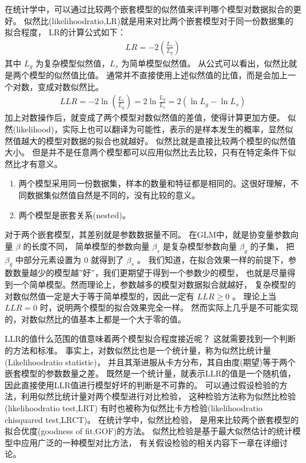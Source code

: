 \documentclass[letterpaper,10pt,english]{sphinxmanual}
\begin{document}
在统计学中，可以通过比较两个嵌套模型的似然值来评判哪个模型对数据拟合的更好。
似然比(likelihood\sphinxhyphen{}ratio,LR)就是用来对比两个嵌套模型对于同一份数据集的拟合程度，
LR的计算公式如下：
\begin{equation}\label{equation:模型评估/content:模型评估/content:5}
\begin{split}LR = -2  \left ( \frac{L_s  }{L_g} \right )\end{split}
\end{equation}
其中 \(L_g\) 为复杂模型似然值，\(L_s\) 为简单模型似然值。
从公式可以看出，似然比就是两个模型的似然值比值。
通常并不直接使用上述似然值的比值，而是会加上一个对数，变成对数似然比。
\begin{equation}\label{equation:模型评估/content:模型评估/content:6}
\begin{split}LLR = -2 \ln \left ( \frac{L_s  }{L_g} \right ) = 2 \ln \frac{L_g}{L_s} = 2 (\ln L_g-\ln L_s)\end{split}
\end{equation}
加上对数操作后，就变成了两个模型对数似然值的差值，使得计算更加方便。
似然(likelihood)，实际上也可以翻译为可能性，表示的是样本发生的概率，显然似然值越大的模型对数据的拟合也就越好。
似然比就是直接比较两个模型的似然值大小。
但是并不是任意两个模型都可以应用似然比去比较，只有在特定条件下似然比才有意义。
\begin{enumerate}
%
\item {} 
两个模型采用同一份数据集，样本的数量和特征都是相同的。这很好理解，不同数据集似然值自然是不同的，没有比较的意义。

\item {} 
两个模型是嵌套关系(nested)。

\end{enumerate}

对于两个嵌套模型，其差别就是参数数据量不同。
在GLM中，就是协变量参数向量 \(\beta\) 的长度不同，
简单模型的参数向量 \(\beta_s\) 是复杂模型参数向量 \(\beta_g\) 的子集，
把 \(\beta_g\) 中部分元素设置为 \(0\) 就得到了 \(\beta_s\) 。
我们知道，在拟合效果一样的前提下，参数数量越少的模型越”好”，我们更期望于得到一个参数少的模型，
也就是尽量得到一个简单模型。然而理论上，参数越多的模型对数据拟合就越好，
复杂模型的对数似然值一定是大于等于简单模型的，因此一定有 \(LLR \ge 0\) 。
理论上当 \(LLR=0\) 时，说明两个模型的拟合效果完全一样。
然而实际上几乎是不可能实现的，对数似然比的值基本上都是一个大于零的值。

LLR的值什么范围的值意味着两个模型拟合程度接近呢？
这就需要找到一个判断的方法和标准。
事实上，对数似然比也是一个统计量，称为似然比统计量(Likelihood\sphinxhyphen{}ratio statistic)，
并且其渐进服从卡方分布，其自由度(期望)等于两个嵌套模型的参数数量之差。
既然是一个统计量，就表示LLR的值是一个随机值，
因此直接使用LLR值进行模型好坏的判断是不可靠的。
可以通过假设检验的方法，利用似然比统计量对两个模型进行对比检验，
这种检验方法称为似然比检验(likelihood\sphinxhyphen{}ratio test,LRT)
有时也被称为似然比卡方检验(likelihood\sphinxhyphen{}ratio chi\sphinxhyphen{}squared test,LRCT)。
在统计学中，似然比检验，
是用来比较两个嵌套模型的拟合优度(goodness of fit,GOF)的方法。
似然比检验是基于最大似然估计的统计模型中应用广泛的一种模型对比方法，
有关假设检验的相关内容下一章在详细讨论。
\end{document}
